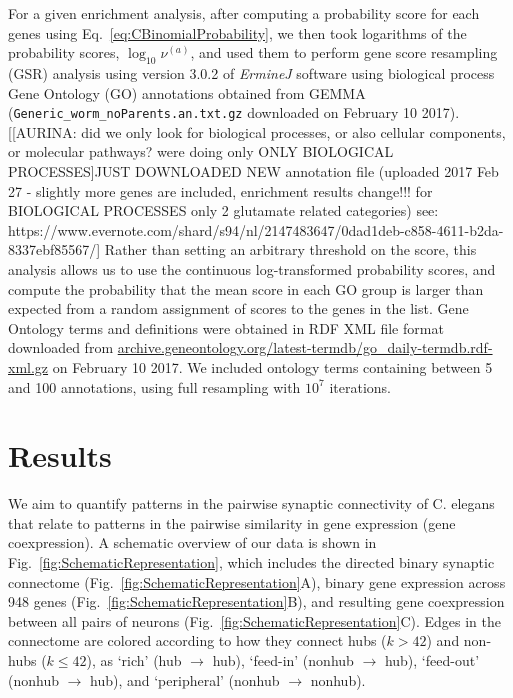 \documentclass[10pt,letterpaper]{article}
\begin{document}
For a given enrichment analysis, after computing a probability score for each genes using Eq.~\eqref{eq:CBinomialProbability}, we then took logarithms of the probability scores, $\log_{10}\nu^{(a)}$, and used them to perform gene score resampling (GSR) analysis using version 3.0.2 of \emph{ErmineJ} software \cite{Gillis2010} using biological process Gene Ontology (GO) annotations \cite{Ashburner2000} obtained from GEMMA \cite{Zoubarev2012} (\texttt{Generic\_worm\_noParents.an.txt.gz} downloaded on February 10 2017).
[[AURINA: did we only look for biological processes, or also cellular components, or molecular pathways? were doing only ONLY BIOLOGICAL PROCESSES]JUST DOWNLOADED NEW annotation file (uploaded 2017 Feb 27 - slightly more genes are included, enrichment results change!!! for BIOLOGICAL PROCESSES only 2 glutamate related categories) see: https://www.evernote.com/shard/s94/nl/2147483647/0dad1deb-c858-4611-b2da-8337ebf85567/]
Rather than setting an arbitrary threshold on the score, this analysis allows us to use the continuous log-transformed probability scores, and compute the probability that the mean score in each GO group is larger than expected from a random assignment of scores to the genes in the list.
Gene Ontology terms and definitions were obtained in RDF XML file format downloaded from \url{archive.geneontology.org/latest-termdb/go_daily-termdb.rdf-xml.gz} on February 10 2017.
We included ontology terms containing between 5 and 100 annotations, using full resampling with $10^{7}$ iterations.


\section*{Results}

We aim to quantify patterns in the pairwise synaptic connectivity of C. elegans that relate to patterns in the pairwise similarity in gene expression (gene coexpression).
A schematic overview of our data is shown in Fig.~\ref{fig:SchematicRepresentation}, which includes the directed binary synaptic connectome (Fig.~\ref{fig:SchematicRepresentation}A), binary gene expression across 948 genes (Fig.~\ref{fig:SchematicRepresentation}B), and resulting gene coexpression between all pairs of neurons (Fig.~\ref{fig:SchematicRepresentation}C).
Edges in the connectome are colored according to how they connect hubs ($k > 42$) and non-hubs ($k \leq 42$), as `rich' (hub $\rightarrow$ hub), `feed-in' (nonhub $\rightarrow$ hub), `feed-out' (nonhub $\rightarrow$ hub), and `peripheral' (nonhub $\rightarrow$ nonhub).
\end{document}
